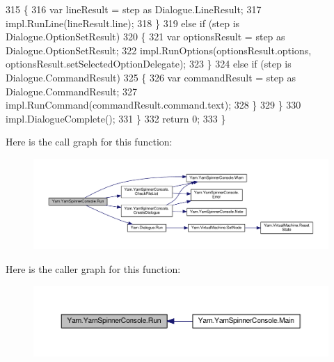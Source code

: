 \begin{DoxyCode}
315                     \{
316                         var lineResult = step as Dialogue.LineResult;
317                         impl.RunLine(lineResult.line);
318                     \}
319                     \textcolor{keywordflow}{else} \textcolor{keywordflow}{if} (step is Dialogue.OptionSetResult)
320                     \{
321                         var optionsResult = step as Dialogue.OptionSetResult;
322                         impl.RunOptions(optionsResult.options, optionsResult.setSelectedOptionDelegate);
323                     \}
324                     \textcolor{keywordflow}{else} \textcolor{keywordflow}{if} (step is Dialogue.CommandResult)
325                     \{
326                         var commandResult = step as Dialogue.CommandResult;
327                         impl.RunCommand(commandResult.command.text);
328                     \}
329                 \}
330                 impl.DialogueComplete();
331             \}
332             \textcolor{keywordflow}{return} 0;
333         \}
\end{DoxyCode}


Here is the call graph for this function\-:
\nopagebreak
\begin{figure}[H]
\begin{center}
\leavevmode
\includegraphics[width=350pt]{a00189_a1b974c55540795a9e643c2ec055fbd51_cgraph}
\end{center}
\end{figure}




Here is the caller graph for this function\-:
\nopagebreak
\begin{figure}[H]
\begin{center}
\leavevmode
\includegraphics[width=350pt]{a00189_a1b974c55540795a9e643c2ec055fbd51_icgraph}
\end{center}
\end{figure}


